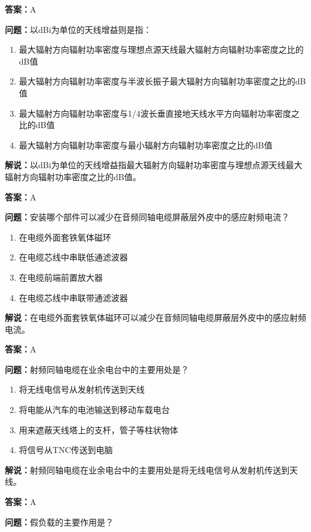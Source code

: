 \textbf{答案：}A

\textbf{问题：}以dBi为单位的天线增益则是指：
\begin{enumerate}[label=\Alph*), leftmargin=3em]
	\item 最大辐射方向辐射功率密度与理想点源天线最大辐射方向辐射功率密度之比的dB值
	\item 最大辐射方向辐射功率密度与半波长振子最大辐射方向辐射功率密度之比的dB值
	\item 最大辐射方向辐射功率密度与1/4波长垂直接地天线水平方向辐射功率密度之比的dB值
	\item 最大辐射方向辐射功率密度与最小辐射方向辐射功率密度之比的dB值
\end{enumerate}

\textbf{解说：}以dBi为单位的天线增益指最大辐射方向辐射功率密度与理想点源天线最大辐射方向辐射功率密度之比的dB值。%

\textbf{答案：}A

\textbf{问题：}安装哪个部件可以减少在音频同轴电缆屏蔽层外皮中的感应射频电流？

\begin{enumerate}[label=\Alph*), leftmargin=3em]
	\item 在电缆外面套铁氧体磁环
	\item 在电缆芯线中串联低通滤波器
	\item 在电缆前端前置放大器
	\item 在电缆芯线中串联带通滤波器
\end{enumerate}

\textbf{解说：}在电缆外面套铁氧体磁环可以减少在音频同轴电缆屏蔽层外皮中的感应射频电流。%

\textbf{答案：}A

\textbf{问题：}射频同轴电缆在业余电台中的主要用处是？

\begin{enumerate}[label=\Alph*), leftmargin=3em]
	\item 将无线电信号从发射机传送到天线
	\item 将电能从汽车的电池输送到移动车载电台
	\item 用来遮蔽天线塔上的支杆，管子等柱状物体
	\item 将信号从TNC传送到电脑
\end{enumerate}

\textbf{解说：}射频同轴电缆在业余电台中的主要用处是将无线电信号从发射机传送到天线。%

\textbf{答案：}A

\textbf{问题：}假负载的主要作用是？

